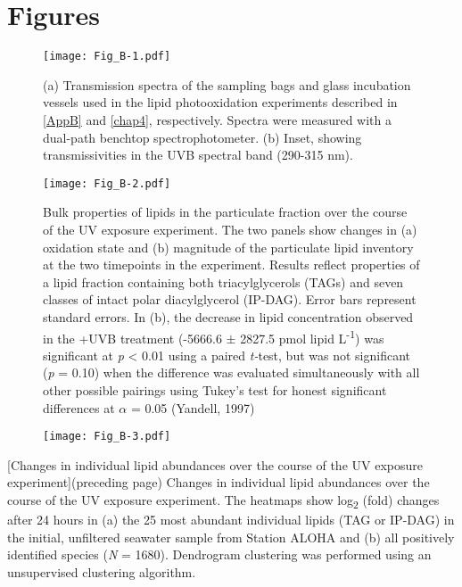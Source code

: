 \clearpage

\section{Figures}

\begin{SCfigure}[0.5][!bh]
\centering
\texttt{[image: Fig\_B-1.pdf]}
\caption[Transmission spectra of sampling bags and glass incubation vessels used in lipid photooxidation experiments]{(a) Transmission spectra of the sampling bags and glass incubation vessels used in the lipid photooxidation experiments described in \autoref{AppB} and \autoref{chap4}, respectively. Spectra were measured with a dual-path benchtop spectrophotometer. (b) Inset, showing transmissivities in the UVB spectral band (290-315 nm).}
\label{fig:abn1}
\end{SCfigure}

\clearpage

\begin{figure}[!th]
\centering
\texttt{[image: Fig\_B-2.pdf]}
\caption[Bulk properties of lipids over the course of the UV exposure experiment]{Bulk properties of lipids in the particulate fraction over the course of the UV exposure experiment. The two panels show changes in (a) oxidation state and (b) magnitude of the particulate lipid inventory at the two timepoints in the experiment. Results reflect properties of a lipid fraction containing both triacylglycerols (TAGs) and seven classes of intact polar diacylglycerol (IP-DAG). Error bars represent standard errors. In (b), the decrease in lipid concentration observed in the +UVB treatment (-5666.6 $\pm$ 2827.5 pmol lipid L\textsuperscript{-1}) was significant at \emph{p} \textless{} 0.01 using a paired \emph{t-}test, but was not significant (\emph{p} = 0.10) when the difference was evaluated simultaneously with all other possible pairings using Tukey's test for honest significant differences at $\alpha$ = 0.05 (Yandell, 1997)
}
\label{fig:abn2}
\end{figure}

\clearpage

\begin{figure}[!p]
\centering
\texttt{[image: Fig\_B-3.pdf]}
\end{figure}
\clearpage
\begingroup
{}
[Changes in individual lipid abundances over the course of the UV exposure experiment]{(preceding page) Changes in individual lipid abundances over the course of the UV exposure experiment. The heatmaps show log\textsubscript{2} (fold) changes after 24 hours in (a) the 25 most abundant individual lipids (TAG or IP-DAG) in the initial, unfiltered seawater sample from Station ALOHA and (b) all positively identified species (\emph{N} = 1680). Dendrogram clustering was performed using an unsupervised clustering algorithm.}
\label{fig:abn3}
\endgroup

